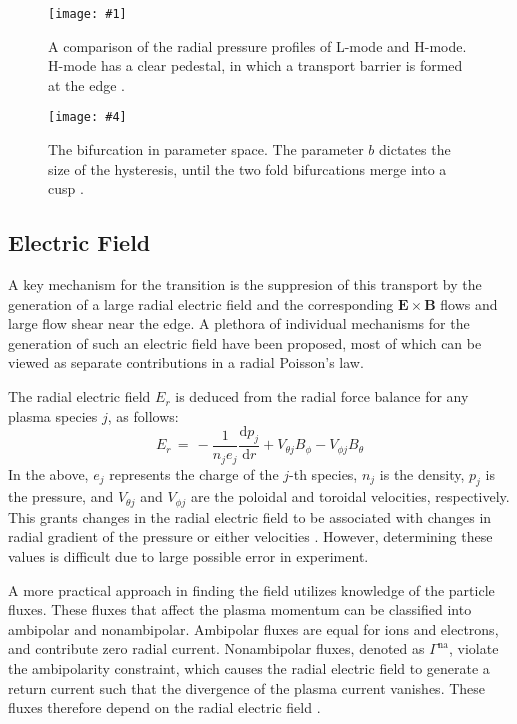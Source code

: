 \documentclass[a4paper]{article}
\newcommand\TwoFig[6]{%
	\sbox\IBoxA{\texttt{[image: \#1]}}
	\sbox\IBoxB{\texttt{[image: \#4]}}%
	\ifdim\ht\IBoxA>\ht\IBoxB
		\setlength\IHeight{\ht\IBoxB}%
	\else\setlength\IHeight{\ht\IBoxA}\fi
	\begin{figure}[!htb]
		\minipage[t]{0.45\textwidth}\centering
			\texttt{[image: \#1]}
			\caption{#2}\label{#3}
		\endminipage\hfill
		\minipage[t]{0.45\textwidth}\centering
			\texttt{[image: \#4]}
			\caption{#5}\label{#6}
		\endminipage
	\end{figure}%
}
\begin{document}
\TwoFig{../Graphics/L-mode_H-mode_compare.png}
	{A comparison of the radial pressure profiles of L-mode and H-mode.
	H-mode has a clear pedestal, in which a transport barrier is formed at the edge \cite{weymiens_bifurcation_2014}.}
	{fig:L-mode_H-mode_compare}
	{../Graphics/Bif_3D.png}
	{The bifurcation in parameter space. The parameter $b$ dictates the size of the hysteresis, until the two fold bifurcations merge into a cusp \cite{weymiens_bifurcation_2014}.}
	{fig:Bif_3D}

\subsection{Electric Field}
A key mechanism for the transition is the suppresion of this transport by the generation of a large radial electric field and the corresponding $\mathbf{E}\times\mathbf{B}$ flows and large flow shear near the edge.
A plethora of individual mechanisms for the generation of such an electric field have been proposed, most of which can be viewed as separate contributions in a radial Poisson's law.

The radial electric field $E_r$ is deduced from the radial force balance for any plasma species $j$, as follows:
\begin{equation}
	E_r \,=\, -\frac{1}{n_j e_j} \frac{\text{d} p_j}{\text{d} r} + V_{\theta j} B_\phi - V_{\phi j} B_\theta
	\label{eq:E_r}
\end{equation}
In the above, $e_j$ represents the charge of the $j$-th species, $n_j$ is the density, $p_j$ is the pressure, and $V_{\theta j}$ and $V_{\phi j}$ are the poloidal and toroidal velocities, respectively.
This grants changes in the radial electric field to be associated with changes in radial gradient of the pressure or either velocities \cite{connor_review_2000}\cite{staps_backstepping_2017}.
However, determining these values is difficult due to large possible error in experiment.

A more practical approach in finding the field utilizes knowledge of the particle fluxes.
These fluxes that affect the plasma momentum can be classified into ambipolar and nonambipolar.
Ambipolar fluxes are equal for ions and electrons, and contribute zero radial current.
Nonambipolar fluxes, denoted as $\Gamma^\text{na}$, violate the ambipolarity constraint, which causes the radial electric field to generate a return current such that the divergence of the plasma current vanishes.
These fluxes therefore depend on the radial electric field \cite{callen_toroidal_2009}.
\end{document}
